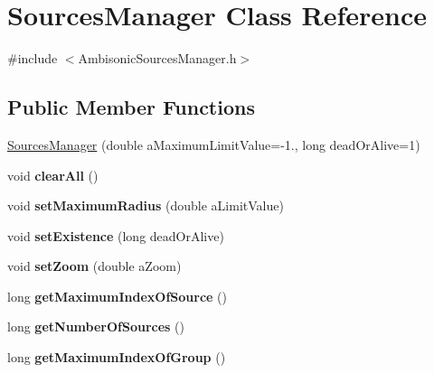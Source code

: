 \hypertarget{class_sources_manager}{\section{Sources\-Manager Class Reference}
\label{class_sources_manager}
}


{\ttfamily \#include $<$Ambisonic\-Sources\-Manager.\-h$>$}

\subsection*{Public Member Functions}
\begin{DoxyCompactItemize}
\item 
\hyperlink{class_sources_manager_a333ef82bab70b995bf0f658c894bee1b}{Sources\-Manager} (double a\-Maximum\-Limit\-Value=-\/1., long dead\-Or\-Alive=1)
\item 
\hypertarget{class_sources_manager_af9d0ecf01dbe68644bc8dff20f73b0b4}{void {\bfseries clear\-All} ()}\label{class_sources_manager_af9d0ecf01dbe68644bc8dff20f73b0b4}

\item 
\hypertarget{class_sources_manager_a4cef73a9817bd65263f6ac26f2b5abc9}{void {\bfseries set\-Maximum\-Radius} (double a\-Limit\-Value)}\label{class_sources_manager_a4cef73a9817bd65263f6ac26f2b5abc9}

\item 
\hypertarget{class_sources_manager_ada2010c9e2699e6968135d0a040acf5c}{void {\bfseries set\-Existence} (long dead\-Or\-Alive)}\label{class_sources_manager_ada2010c9e2699e6968135d0a040acf5c}

\item 
\hypertarget{class_sources_manager_ab918a5432313565e729ddeb2b77aa090}{void {\bfseries set\-Zoom} (double a\-Zoom)}\label{class_sources_manager_ab918a5432313565e729ddeb2b77aa090}

\item 
\hypertarget{class_sources_manager_a8a022a84328eb83d7a932f3cee4be166}{long {\bfseries get\-Maximum\-Index\-Of\-Source} ()}\label{class_sources_manager_a8a022a84328eb83d7a932f3cee4be166}

\item 
\hypertarget{class_sources_manager_a3f89716ed8f32ff9c29cfb25687a8401}{long {\bfseries get\-Number\-Of\-Sources} ()}\label{class_sources_manager_a3f89716ed8f32ff9c29cfb25687a8401}

\item 
\hypertarget{class_sources_manager_a51edf08e7d2f513efd84a6cdba4ead3c}{long {\bfseries get\-Maximum\-Index\-Of\-Group} ()}\label{class_sources_manager_a51edf08e7d2f513efd84a6cdba4ead3c}


\end{DoxyCompactItemize}

